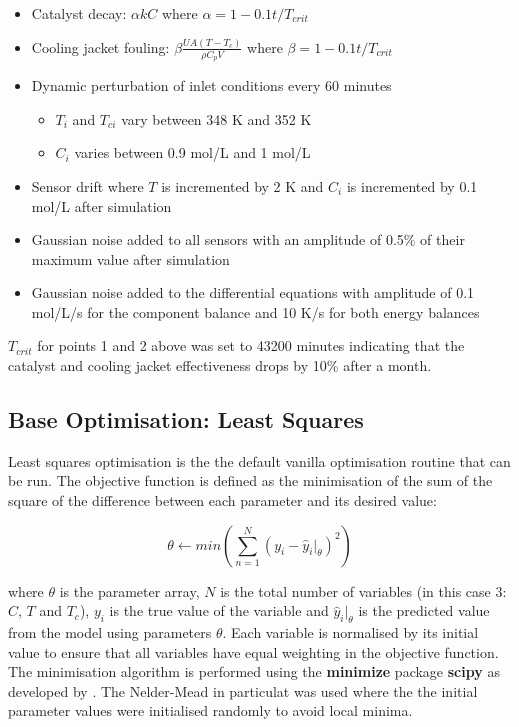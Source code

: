 \documentclass{article}
\begin{document}
\begin{itemize}
	\item Catalyst decay: $\alpha kC$ where $\alpha=1-0.1 t/T_{crit}$  
	\item Cooling jacket fouling: $\beta \frac{UA(T-T_c)}{\rho C_p V}$ where $\beta=1-0.1 t/T_{crit}$
	\item Dynamic perturbation of inlet conditions every 60 minutes 
	\begin{itemize}
		\item $T_i$ and $T_{ci}$ vary between 348 K and 352 K
		\item $C_i$ varies between 0.9 mol/L and 1 mol/L
	\end{itemize}
	\item Sensor drift where $T$ is incremented by 2 K and $C_i$ is incremented by 0.1 mol/L after simulation
	\item Gaussian noise added to all sensors with an amplitude of 0.5\% of their maximum value after simulation
	\item Gaussian noise added to the differential equations with amplitude of 0.1 mol/L/s for the component balance and 10 K/s for both energy balances
\end{itemize}

$T_{crit}$ for points 1 and 2 above was set to 43200 minutes indicating that the catalyst and cooling jacket effectiveness drops by 10\% after a month.

\subsection{Base Optimisation: Least Squares}

Least squares optimisation is the the default vanilla optimisation routine that can be run. The objective function is defined as the minimisation of the sum of the square of the difference between each parameter and its desired value:

\begin{equation}
	\theta \leftarrow min(\sum_{n=1}^{N}(y_i-\hat{y}_i\vert_\theta)^2)
\end{equation}

where $\theta$ is the parameter array, $N$ is the total number of variables (in this case 3: $C$, $T$ and $T_c$), $y_i$ is the true value of the variable and $\hat{y}_i\vert_\theta$ is the predicted value from the model using parameters $\theta$. Each variable is normalised by its initial value to ensure that all variables have equal weighting in the objective function. The minimisation algorithm is performed using the \textbf{minimize} package \textbf{scipy} as developed by \cite{2020SciPy-NMeth}.	The Nelder-Mead in particulat was used where the the initial parameter values were initialised randomly to avoid local minima.
\end{document}
